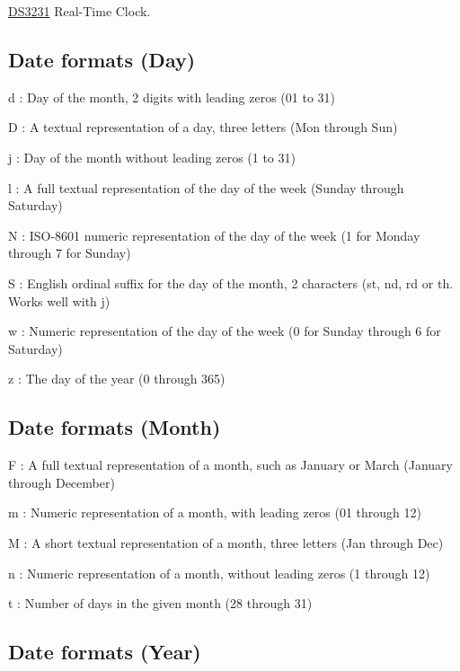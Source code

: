 \hyperlink{class_d_s3231}{D\+S3231} Real-\/\+Time Clock.



\subsection*{Date formats (Day) }


\begin{DoxyItemize}
\item d \+: Day of the month, 2 digits with leading zeros (01 to 31)
\item D \+: A textual representation of a day, three letters (Mon through Sun)
\item j \+: Day of the month without leading zeros (1 to 31)
\item l \+: A full textual representation of the day of the week (Sunday through Saturday)
\item N \+: I\+S\+O-\/8601 numeric representation of the day of the week (1 for Monday through 7 for Sunday)
\item S \+: English ordinal suffix for the day of the month, 2 characters (st, nd, rd or th. Works well with j)
\item w \+: Numeric representation of the day of the week (0 for Sunday through 6 for Saturday)
\item z \+: The day of the year (0 through 365)
\end{DoxyItemize}

\subsection*{Date formats (Month) }


\begin{DoxyItemize}
\item F \+: A full textual representation of a month, such as January or March (January through December)
\item m \+: Numeric representation of a month, with leading zeros (01 through 12)
\item M \+: A short textual representation of a month, three letters (Jan through Dec)
\item n \+: Numeric representation of a month, without leading zeros (1 through 12)
\item t \+: Number of days in the given month (28 through 31)
\end{DoxyItemize}

\subsection*{Date formats (Year) }


